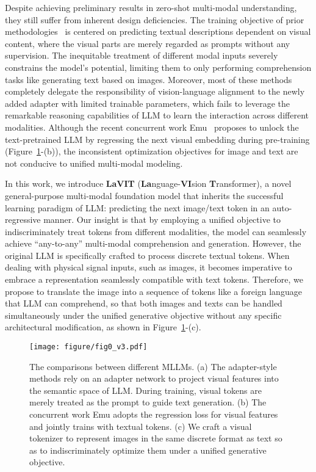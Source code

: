 Despite achieving preliminary results in zero-shot multi-modal understanding, they still suffer from inherent design deficiencies. The training objective of prior methodologies~\citep{li2023blip,huang2023language,zhu2023minigpt} is centered on predicting textual descriptions dependent on visual content, where the visual parts are merely regarded as prompts without any supervision. The inequitable treatment of different modal inputs severely constrains the model's potential, limiting them to only performing comprehension tasks like generating text based on images. Moreover, most of these methods completely delegate the responsibility of vision-language alignment to the newly added adapter with limited trainable parameters, which fails to leverage the remarkable reasoning capabilities of LLM to learn the interaction across different modalities. Although the recent concurrent work Emu~\citep{sun2023generative} proposes to unlock the text-pretrained LLM by regressing the next visual embedding during pre-training (Figure~\ref{fig:fig0}-(b)), the inconsistent optimization objectives for image and text are not conducive to unified multi-modal modeling.

In this work, we introduce \textbf{LaVIT} (\textbf{La}nguage-\textbf{VI}sion \textbf{T}ransformer), a novel general-purpose multi-modal foundation model that inherits the successful learning paradigm of LLM: predicting the next image/text token in an auto-regressive manner. Our insight is that by employing a unified objective to indiscriminately treat tokens from different modalities, the model can seamlessly achieve ``any-to-any'' multi-modal comprehension and generation. However, the original LLM is specifically crafted to process discrete textual tokens. When dealing with physical signal inputs, such as images, it becomes imperative to embrace a representation seamlessly compatible with text tokens. Therefore, we propose to translate the image into a sequence of tokens like a foreign language that LLM can comprehend, so that both images and texts can be handled simultaneously under the unified generative objective without any specific architectural modification, as shown in Figure~\ref{fig:fig0}-(c).

\begin{figure}[t]
\begin{center}
\texttt{[image: figure/fig0\_v3.pdf]}
\end{center}
\vspace{-0.1in}
\caption{\small The comparisons between different MLLMs. (a) The adapter-style methods rely on an adapter network to project visual features into the semantic space of LLM. During training, visual tokens are merely treated as the prompt to guide text generation. (b) The concurrent work Emu adopts the regression loss for visual features and jointly trains with textual tokens. (c) We craft a visual tokenizer to represent images in the same discrete format as text so as to indiscriminately optimize them under a unified generative objective.}
\label{fig:fig0}
\vspace{-0.2in}
\end{figure}

